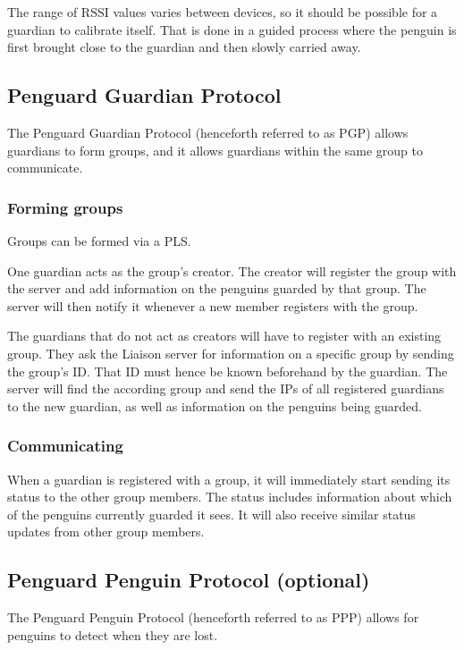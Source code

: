 \documentclass{report}
\begin{document}
The range of RSSI values varies between devices, so it should be possible for a guardian to calibrate itself. That is done in a guided process where the penguin is first brought close to the guardian and then slowly carried away.

\subsection{Penguard Guardian Protocol}

The Penguard Guardian Protocol (henceforth referred to as PGP) allows guardians to form groups, and it allows guardians within the same group to communicate.

\subsubsection{Forming groups}

Groups can be formed via a PLS.

One guardian acts as the group's creator. The creator will register the group with the server and add information on the penguins guarded by that group. The server will then notify it whenever a new member registers with the group.

The guardians that do not act as creators will have to register with an existing group. They ask the Liaison server for information on a specific group by sending the group's ID. That ID must hence be known beforehand by the guardian. The server will find the according group and send the IPs of all registered guardians to the new guardian, as well as information on the penguins being guarded.

\subsubsection{Communicating}

When a guardian is registered with a group, it will immediately start sending its status to the other group members. The status includes information about which of the penguins currently guarded it sees. It will also receive similar status updates from other group members.

\subsection{Penguard Penguin Protocol (optional)}

The Penguard Penguin Protocol (henceforth referred to as PPP) allows for penguins to detect when they are lost.
\end{document}
